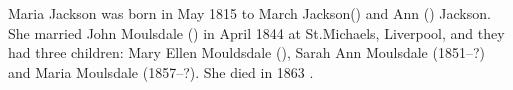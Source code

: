
Maria Jackson was born in May 1815 to March Jackson() and Ann () Jackson. She married John Moulsdale () in April 1844 at St.Michaels, Liverpool, and they had three children:
Mary Ellen Mouldsdale (), Sarah Ann Moulsdale (1851--?) and Maria Moulsdale (1857--?).
She died in 1863 \cite{MariaJacksonDeath}.
